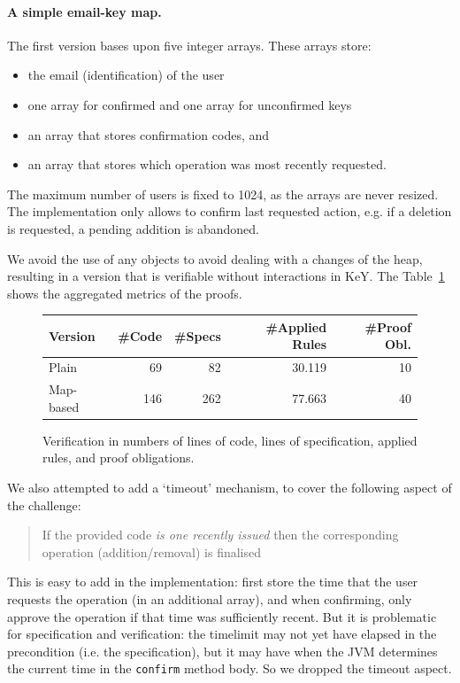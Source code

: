 \documentclass{llncs}
\begin{document}
\paragraph{A simple email-key map.}
%
The first version bases upon five integer arrays.
These arrays store:
%
\begin{itemize}
  \item the email (identification) of the user
  \item one array for confirmed and one array for unconfirmed keys
  \item an array that stores confirmation codes, and
  \item an array that stores which operation was most recently requested.
\end{itemize}
%
The maximum number of users is fixed to 1024, as the arrays are never resized.
The implementation only allows to confirm last requested action, e.g. if a
deletion is requested, a pending addition is abandoned.

We avoid the use of any objects to avoid dealing with a changes of the heap,
resulting in a version that is verifiable without interactions in KeY. The
Table~\ref{fig:numbers} shows the aggregated metrics of the proofs.

\begin{figure}[t]
  \centering
  \begin{tabular}{ lrrrr }
    Version    & \#Code & \#Specs & \#Applied Rules &\#Proof Obl. \\
    \toprule
    Plain & 69 & 82 & 30.119 & 10 \\
    Map-based & 146 & 262 & 77.663  & 40 \\
    \bottomrule
  \end{tabular}
  \caption{Verification in numbers of lines of code, lines of specification,
    applied rules, and proof obligations.}
  \label{fig:numbers}
\end{figure}




We also attempted to add a `timeout' mechanism, to cover the following aspect of
the challenge:
\begin{quote}
  If the provided code \emph{is one recently issued} then the corresponding
  operation (addition/removal) is finalised
\end{quote}
This is easy to add in the implementation: first store the time that the user
requests the operation (in an additional array), and when confirming, only
approve the operation if that time was sufficiently recent. But it is
problematic for specification and verification: the timelimit may not yet have
elapsed in the precondition (i.e. the specification), but it may have when the
JVM determines the current time in the \verb|confirm| method body. So we dropped
the timeout aspect.
\end{document}
